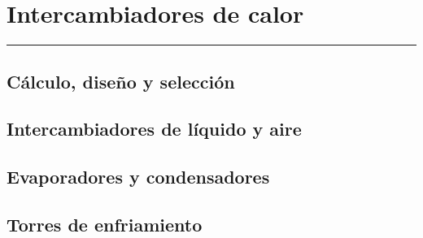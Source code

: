 \chapter{Intercambiadores de calor}

\vspace{\fill}

\hrule

\vspace{.3cm}

{\large \lipsum[1]} 

\pagestyle{fancy}

\newpage


	\section{Cálculo, diseño y selección}
	\Biblio{}

	

	\section{Intercambiadores de líquido y aire}
	\Biblio{}

	\section{Evaporadores y condensadores}
	\Biblio{}

	\section{Torres de enfriamiento}
	\Biblio{}


\newpage
\pagestyle{empty}